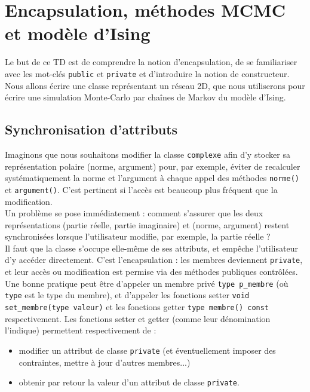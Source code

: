 \documentclass{book}
\newcommand{\inline}[1]{\texttt{#1}}
\begin{document}
\setcounter{chapter}{2}

\chapter{Encapsulation, méthodes MCMC et modèle d'Ising}

Le but de ce TD est de comprendre la notion d'encapsulation, de se familiariser avec les mot-clés \inline{public} et \inline{private} et d'introduire la notion de constructeur.\\

Nous allons écrire une classe représentant un réseau 2D, que nous utiliserons pour écrire une simulation Monte-Carlo par chaînes de Markov du modèle d'Ising.

\section{Synchronisation d'attributs}

Imaginons que nous souhaitons modifier la classe \inline{complexe} afin d'y stocker sa représentation polaire (norme, argument) pour, par exemple, éviter de recalculer systématiquement la norme et l'argument à chaque appel des méthodes \inline{norme()} et \inline{argument()}. C'est pertinent si l'accès est beaucoup plus fréquent que la modification.\\

Un problème se pose immédiatement : comment s'assurer que les deux représentations (partie réelle, partie imaginaire) et (norme, argument) restent synchronisées lorsque l'utilisateur modifie, par exemple, la partie réelle ?\\

Il faut que la classe s'occupe elle-même de ses attributs, et empêche l'utilisateur d'y accéder directement. C'est l'encapsulation : les membres deviennent \inline{private}, et leur accès ou modification est permise via des méthodes publiques contrôlées. Une bonne pratique peut être d'appeler un membre privé \inline{type p_membre} (où \inline{type} est le type du membre), et d'appeler les fonctions setter \inline{void set_membre(type valeur)} et les fonctions getter \inline{type membre() const} respectivement. Les fonctions setter et getter (comme leur dénomination l'indique) permettent respectivement de :
\begin{itemize}
\item modifier un attribut de classe \inline{private} (et éventuellement imposer des contraintes, mettre à jour d'autres membres...)
\item obtenir par retour la valeur d'un attribut de classe \inline{private}.
\end{itemize}
\end{document}

